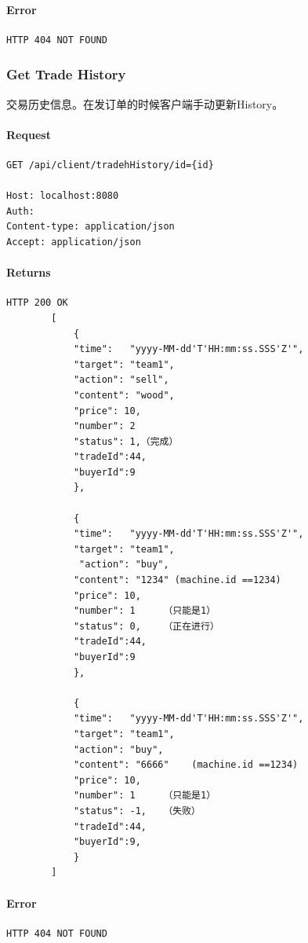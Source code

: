 \documentclass{article}
\begin{document}
					\paragraph*{Error}
\begin{lstlisting}
HTTP 404 NOT FOUND
\end{lstlisting}

				\subsubsection{Get Trade History}
					交易历史信息。在发订单的时候客户端手动更新History。
					\paragraph*{Request}
\begin{lstlisting}
GET /api/client/tradehHistory/id={id}

Host: localhost:8080
Auth:
Content-type: application/json
Accept: application/json
\end{lstlisting}
					\paragraph*{Returns}
\begin{lstlisting}
HTTP 200 OK
        [
            {
            "time":   "yyyy-MM-dd'T'HH:mm:ss.SSS'Z'",
            "target": "team1",
            "action": "sell",
            "content": "wood",
            "price": 10,
            "number": 2
            "status": 1,（完成）
            "tradeId":44,
            "buyerId":9
            },

            {
            "time":   "yyyy-MM-dd'T'HH:mm:ss.SSS'Z'",
            "target": "team1",
             "action": "buy",
            "content": "1234" (machine.id ==1234)
            "price": 10,
            "number": 1     （只能是1）
            "status": 0,    （正在进行）
            "tradeId":44,
            "buyerId":9
            },

            {
            "time":   "yyyy-MM-dd'T'HH:mm:ss.SSS'Z'",
            "target": "team1",
            "action": "buy",
            "content": "6666"    (machine.id ==1234)
            "price": 10,
            "number": 1     （只能是1）
            "status": -1,   （失败）
            "tradeId":44,
            "buyerId":9,
            }
        ]\end{lstlisting}
					\paragraph*{Error}
\begin{lstlisting}
HTTP 404 NOT FOUND
\end{lstlisting}
\end{document}
